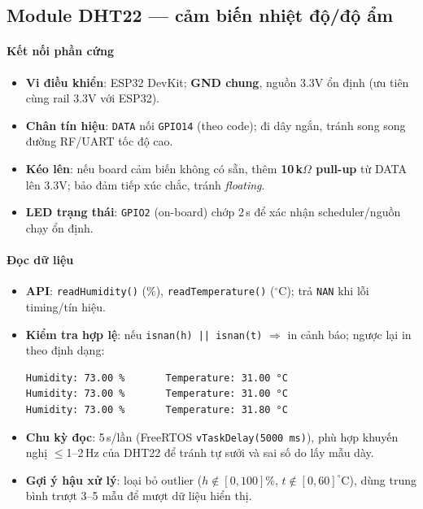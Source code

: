 \subsection{Module DHT22 — cảm biến nhiệt độ/độ ẩm }

\paragraph{Kết nối phần cứng}
\begin{itemize}
  \item \textbf{Vi điều khiển}: ESP32 DevKit; \textbf{GND chung}, nguồn 3.3V ổn định (ưu tiên cùng rail 3.3V với ESP32).
  \item \textbf{Chân tín hiệu}: \texttt{DATA} nối \texttt{GPIO14} (theo code); đi dây ngắn, tránh song song đường RF/UART tốc độ cao.
  \item \textbf{Kéo lên}: nếu board cảm biến không có sẵn, thêm \textbf{10\,k$\Omega$ pull-up} từ DATA lên 3.3V; bảo đảm tiếp xúc chắc, tránh \emph{floating}.
  \item \textbf{LED trạng thái}: \texttt{GPIO2} (on-board) chớp 2\,s để xác nhận scheduler/nguồn chạy ổn định.
\end{itemize}

\paragraph{Đọc dữ liệu}
\begin{itemize}
  \item \textbf{API}: \texttt{readHumidity()} (\%), \texttt{readTemperature()} ($^\circ$C); trả \texttt{NAN} khi lỗi timing/tín hiệu.
  \item \textbf{Kiểm tra hợp lệ}: nếu \texttt{isnan(h) || isnan(t)} $\Rightarrow$ in cảnh báo; ngược lại in theo định dạng:
\begin{verbatim}
Humidity: 73.00 %       Temperature: 31.00 °C
Humidity: 73.00 %       Temperature: 31.00 °C
Humidity: 73.00 %       Temperature: 31.80 °C
\end{verbatim}
  \item \textbf{Chu kỳ đọc}: 5\,s/lần (FreeRTOS \texttt{vTaskDelay(5000\,ms)}), phù hợp khuyến nghị $\leq$1–2\,Hz của DHT22 để tránh tự sưởi và sai số do lấy mẫu dày.
  \item \textbf{Gợi ý hậu xử lý}: loại bỏ outlier (\(h\notin[0,100]\%\), \(t\notin[0,60]^\circ\)C), dùng trung bình trượt 3–5 mẫu để mượt dữ liệu hiển thị.
\end{itemize}

